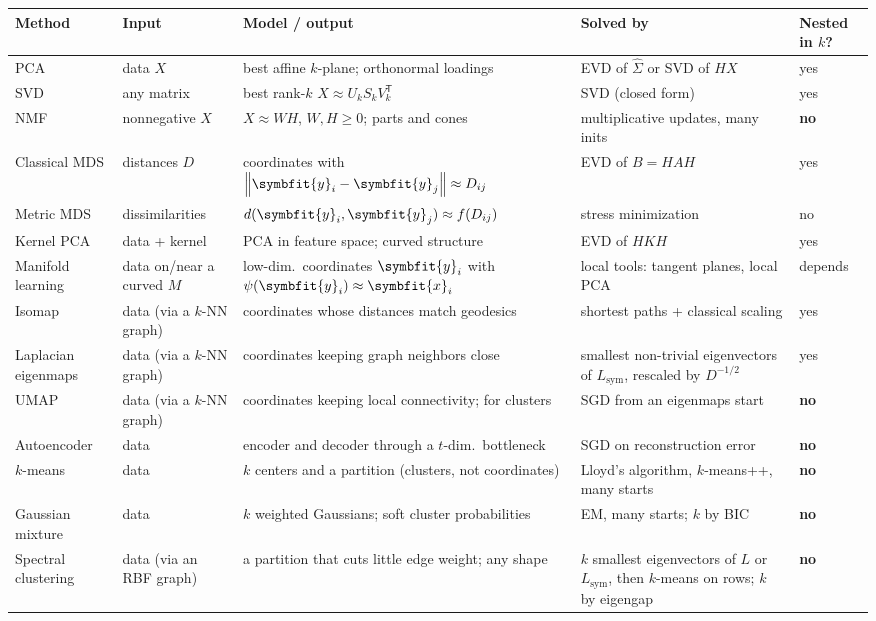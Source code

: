 \documentclass[11pt]{article}
\newcommand{\bm}[1]{\symbfit{#1}}
\newcommand{\vx}{\bm{x}}
\newcommand{\vy}{\bm{y}}
\newcommand{\Sig}{\widehat{\Sigma}}
\newcommand{\T}{^{\mathsf T}}
\newcommand{\norm}[1]{\left\lVert #1\right\rVert}
\begin{document}
\begin{center}
\renewcommand{\arraystretch}{1.35}
\small
\begin{tabular}{>{\raggedright\arraybackslash}p{1.9cm}>{\raggedright\arraybackslash}p{2.5cm}>{\raggedright\arraybackslash}p{4.3cm}>{\raggedright\arraybackslash}p{3.6cm}>{\raggedright\arraybackslash}p{1.4cm}}
\toprule
Method & Input & Model / output & Solved by & Nested in $k$? \\
\midrule
PCA & data $X$ & best affine $k$-plane; orthonormal loadings & EVD of $\Sig$ or SVD of $HX$ & yes \\
SVD & any matrix & best rank-$k$ $X\approx U_kS_kV_k\T$ & SVD (closed form) & yes \\
NMF & nonnegative $X$ & $X\approx WH$, $W,H\ge0$; parts and cones & multiplicative updates, many inits & \textbf{no} \\
Classical MDS & distances $D$ & coordinates with $\norm{\vy_i-\vy_j}\approx D_{ij}$ & EVD of $B=HAH$ & yes \\
Metric MDS & dissimilarities & $d(\vy_i,\vy_j)\approx f(D_{ij})$ & stress minimization & no \\
Kernel PCA & data + kernel & PCA in feature space; curved structure & EVD of $HKH$ & yes \\
Manifold learning & data on/near a curved $M$ & low-dim.\ coordinates $\bm y_i$ with $\psi(\bm y_i)\approx\vx_i$ & local tools: tangent planes, local PCA & depends \\
Isomap & data (via a $k$-NN graph) & coordinates whose distances match geodesics & shortest paths + classical scaling & yes \\
Laplacian eigenmaps & data (via a $k$-NN graph) & coordinates keeping graph neighbors close & smallest non-trivial eigenvectors of $L_{\mathrm{sym}}$, rescaled by $D^{-1/2}$ & yes \\
UMAP & data (via a $k$-NN graph) & coordinates keeping local connectivity; for clusters & SGD from an eigenmaps start & \textbf{no} \\
Autoencoder & data & encoder and decoder through a $t$-dim.\ bottleneck & SGD on reconstruction error & \textbf{no} \\
$k$-means & data & $k$ centers and a partition (clusters, not coordinates) & Lloyd's algorithm, $k$-means++, many starts & \textbf{no} \\
Gaussian mixture & data & $k$ weighted Gaussians; soft cluster probabilities & EM, many starts; $k$ by BIC & \textbf{no} \\
Spectral clustering & data (via an RBF graph) & a partition that cuts little edge weight; any shape & $k$ smallest eigenvectors of $L$ or $L_{\mathrm{sym}}$, then $k$-means on rows; $k$ by eigengap & \textbf{no} \\
\bottomrule
\end{tabular}
\end{center}
\end{document}
